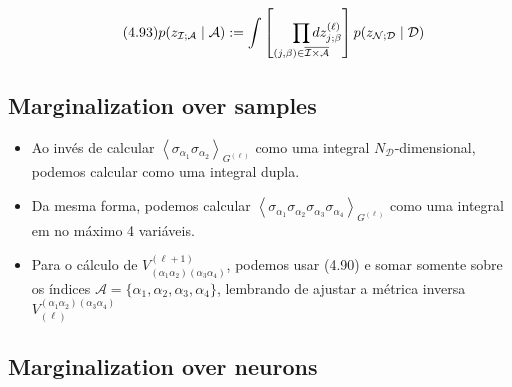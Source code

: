 \documentclass{beamer}
\newcommand{\EE}{\mathbb{E}}
\newcommand{\Dcal}{\mathcal{D}}
\newcommand{\Ical}{\mathcal{I}}
\newcommand{\Ncal}{\mathcal{N}}
\newcommand{\Acal}{\mathcal{A}}
\def\mi#1{{\alpha_{#1}}}
\def\eell{{(\ell)}}
\def\eellum{{(\ell+1)}}
\newcommand{\Vertice}[5]{V^{(#1)}_{(\mi#2\mi#3)(\mi#4\mi#5)}}
\newcommand{\Verticeinv}[5]{V_{(#1)}^{(\mi#2\mi#3)(\mi#4\mi#5)}}
\newcommand{\Expectation}[2]{\left\langle #1 \right\rangle_{#2}}
\newcommand{\zia}[2]{z_{i_{#1};\mi{#2}}}
\begin{document}
\begin{frame}
	\begin{equation*}\tag{4.93}
		p(z_{\Ical;\Acal}\mid \Acal) := \int\left[{\prod_{(j,\beta)\in \overline{\Ical\times\Acal}}} \hspace*{-12pt} dz_{j;\beta}^\eell\right] p(z_{\Ncal;\Dcal}\mid \Dcal) 
	\end{equation*}
\end{frame}

\subsection{Marginalization over samples}


\begin{frame}
	\begin{itemize}
	\item Ao invés de calcular $\Expectation{\sigma_{\mi1}\sigma_{\mi2}}{G^\eell}$ como uma integral $N_\Dcal$-dimensional, podemos calcular como uma integral dupla.
	\item Da mesma forma, podemos calcular $\Expectation{\sigma_{\mi1}\sigma_{\mi2}\sigma_\mi3\sigma_\mi4}{G^\eell}$ como uma integral em no máximo 4 variáveis.
	\item Para o cálculo de $\Vertice{\ell+1}1234$, podemos usar (4.90) e somar somente sobre os índices $\Acal = \{\mi1,\mi2,\mi3,\mi4\}$, lembrando de ajustar a métrica inversa $\Verticeinv{\ell}1234$ 
	\end{itemize}

\end{frame}

\subsection{Marginalization over neurons}
\end{document}
